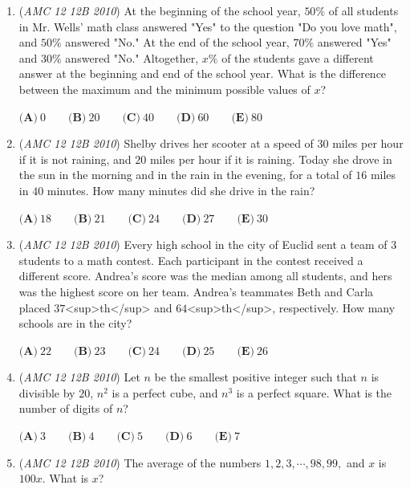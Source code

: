 \begin{enumerate}
 $\textbf{(A)}\ -5 \qquad \textbf{(B)}\ -3 \qquad \textbf{(C)}\ 0 \qquad \textbf{(D)}\ 3 \qquad \textbf{(E)}\ 5$


	\item (\textit{AMC 12 12B 2010}) At the beginning of the school year, $50\%$ of all students in Mr. Wells' math class answered "Yes" to the question "Do you love math", and $50\%$ answered "No." At the end of the school year, $70\%$ answered "Yes" and $30\%$ answered "No." Altogether, $x\%$ of the students gave a different answer at the beginning and end of the school year. What is the difference between the maximum and the minimum possible values of $x$?


 $\textbf{(A)}\ 0 \qquad \textbf{(B)}\ 20 \qquad \textbf{(C)}\ 40 \qquad \textbf{(D)}\ 60 \qquad \textbf{(E)}\ 80$


	\item (\textit{AMC 12 12B 2010}) Shelby drives her scooter at a speed of $30$ miles per hour if it is not raining, and $20$ miles per hour if it is raining. Today she drove in the sun in the morning and in the rain in the evening, for a total of $16$ miles in $40$ minutes. How many minutes did she drive in the rain?


 $\textbf{(A)}\ 18 \qquad \textbf{(B)}\ 21 \qquad \textbf{(C)}\ 24 \qquad \textbf{(D)}\ 27 \qquad \textbf{(E)}\ 30$


	\item (\textit{AMC 12 12B 2010}) Every high school in the city of Euclid sent a team of $3$ students to a math contest. Each participant in the contest received a different score. Andrea's score was the median among all students, and hers was the highest score on her team. Andrea's teammates Beth and Carla placed $37$<sup>th</sup> and $64$<sup>th</sup>, respectively. How many schools are in the city?


 $\textbf{(A)}\ 22 \qquad \textbf{(B)}\ 23 \qquad \textbf{(C)}\ 24 \qquad \textbf{(D)}\ 25 \qquad \textbf{(E)}\ 26$


	\item (\textit{AMC 12 12B 2010}) Let $n$ be the smallest positive integer such that $n$ is divisible by $20$, $n^2$ is a perfect cube, and $n^3$ is a perfect square. What is the number of digits of $n$?


 $\textbf{(A)}\ 3 \qquad \textbf{(B)}\ 4 \qquad \textbf{(C)}\ 5 \qquad \textbf{(D)}\ 6 \qquad \textbf{(E)}\ 7$


	\item (\textit{AMC 12 12B 2010}) The average of the numbers $1, 2, 3,\cdots, 98, 99,$ and $x$ is $100x$. What is $x$?



\end{enumerate}
